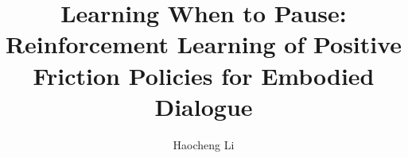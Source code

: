 \documentclass[letterpaper]{article}
\title{Learning When to Pause: Reinforcement Learning of Positive Friction Policies for Embodied Dialogue}
\author{
    Haocheng Li \\
}
\begin{document}
\maketitle

\begin{abstract}

\end{abstract}










\end{document}

